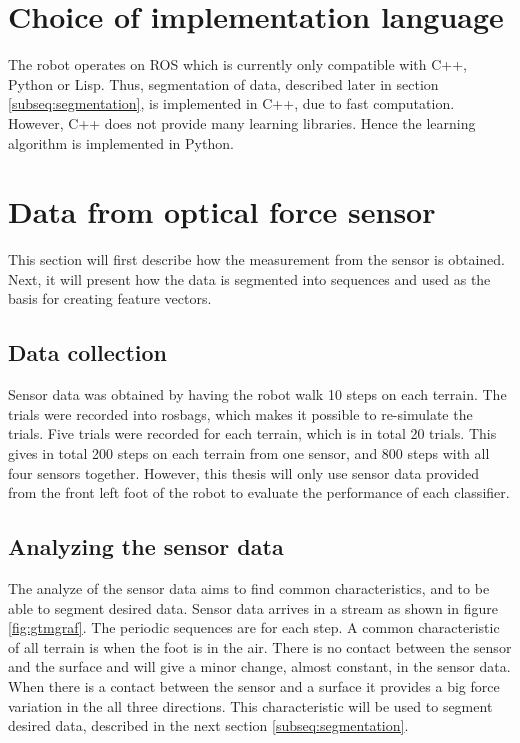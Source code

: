 \documentclass[USenglish]{ifimaster}  %
\begin{document}
\section{Choice of implementation language}
The robot operates on ROS which is currently only compatible with C++, Python or Lisp. Thus, segmentation of data, described later in section \ref{subseq:segmentation}, is implemented in C++, due to fast computation. However, C++ does not provide many learning libraries. Hence the learning algorithm is implemented in Python. 
			
\section{Data from optical force sensor}
This section will first describe how the measurement from the sensor is obtained. Next, it will present how the data is segmented into sequences and used as the basis for creating feature vectors.
	
\subsection{Data collection}
Sensor data was obtained by having the robot walk 10 steps on each terrain. The trials were recorded into rosbags, which makes it possible to re-simulate the trials. Five trials were recorded for each terrain, which is in total 20 trials. This gives in total 200 steps on each terrain from one sensor, and 800 steps with all four sensors together. However, this thesis will only use sensor data provided from the front left foot of the robot to evaluate the performance of each classifier.
	
\subsection{Analyzing the sensor data}\label{sec:analyzopto}
The analyze of the sensor data aims to find common characteristics, and to be able to segment desired data. Sensor data arrives in a stream as shown in figure \ref{fig:gtmgraf}. The periodic sequences are for each step. A common characteristic of all terrain is when the foot is in the air. There is no contact between the sensor and the surface and will give a minor change, almost constant, in the sensor data. When there is a contact between the sensor and a surface it provides a big force variation in the all three directions. This characteristic will be used to segment desired data, described in the next section \ref{subseq:segmentation}.
\end{document}
